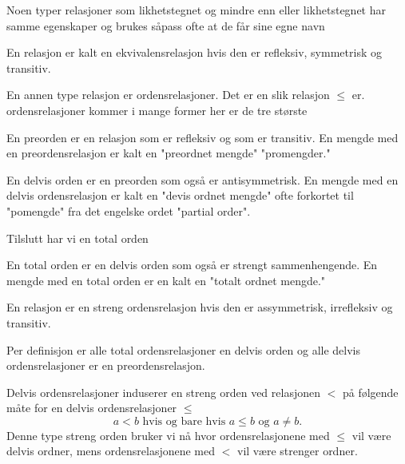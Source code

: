 Noen typer relasjoner som likhetstegnet og mindre enn eller likhetstegnet har samme egenskaper og brukes såpass ofte at de får sine egne navn

\begin{definition}\label{Def:EkvivRel}
    En relasjon er kalt en ekvivalensrelasjon hvis den er refleksiv, symmetrisk og transitiv.
\end{definition}

En annen type relasjon er ordensrelasjoner. Det er en slik relasjon $\leq$ er. ordensrelasjoner kommer i mange former her er de tre største

\begin{definition}\label{Def:Preord}
    En preorden er en relasjon som er refleksiv og som er transitiv. En mengde med en preordensrelasjon er kalt en "preordnet mengde" "promengder."
\end{definition}

\begin{definition}\label{Def:Partord}
    En delvis orden er en preorden som også er antisymmetrisk. En mengde med en delvis ordensrelasjon er kalt en "devis ordnet mengde" ofte forkortet til "pomengde" fra det engelske ordet "partial order".
\end{definition}

Tilslutt har vi en total orden

\begin{definition}\label{Def:Totord}
    En total orden er en delvis orden som også er strengt sammenhengende. En mengde med en total orden er en kalt en "totalt ordnet mengde."
\end{definition}

\begin{definition}\label{Def:Strengord}
    En relasjon er en streng ordensrelasjon hvis den er assymmetrisk, irrefleksiv og transitiv.
\end{definition}

\begin{remark}\label{Rem:OrdRelHiriarki}
Per definisjon er alle total ordensrelasjoner en delvis orden og alle delvis ordensrelasjoner er en preordensrelasjon.
\end{remark}

\begin{remark}\label{Rem:Strengord}
    Delvis ordensrelasjoner induserer en streng orden ved relasjonen $<$ på følgende måte for en delvis ordensrelasjoner $\leq$
    \[a<b \text{ hvis og bare hvis } a\leq b \text{ og } a\neq b.\]
    Denne type streng orden bruker vi nå hvor ordensrelasjonene med $\leq$ vil være delvis ordner, mens ordensrelasjonene med $<$ vil være strenger ordner.
\end{remark}

